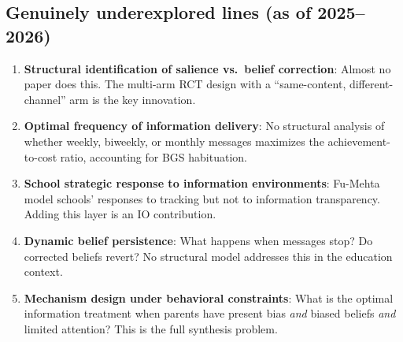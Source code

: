 \documentclass[11pt]{article}
\begin{document}
\subsection{Genuinely underexplored lines (as of 2025--2026)}

\begin{enumerate}
  \item \textbf{Structural identification of salience vs.\ belief correction}: Almost no paper does this. The multi-arm RCT design with a ``same-content, different-channel'' arm is the key innovation.
  \item \textbf{Optimal frequency of information delivery}: No structural analysis of whether weekly, biweekly, or monthly messages maximizes the achievement-to-cost ratio, accounting for BGS habituation.
  \item \textbf{School strategic response to information environments}: Fu-Mehta model schools' responses to tracking but not to information transparency. Adding this layer is an IO contribution.
  \item \textbf{Dynamic belief persistence}: What happens when messages stop? Do corrected beliefs revert? No structural model addresses this in the education context.
  \item \textbf{Mechanism design under behavioral constraints}: What is the optimal information treatment when parents have present bias \emph{and} biased beliefs \emph{and} limited attention? This is the full synthesis problem.
\end{enumerate}
\end{document}
